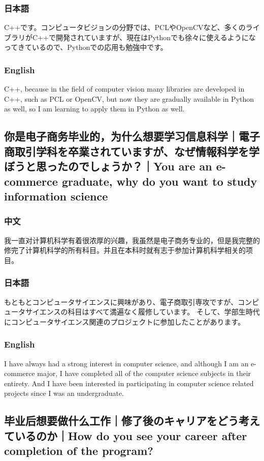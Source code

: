 \documentclass[lang=cn,11pt,a4paper]{elegantpaper}
\begin{document}
\subsubsection{日本語}
C++です。コンピュータビジョンの分野では、PCLやOpenCVなど、多くのライブラリがC++で開発されていますが、現在はPythonでも徐々に使えるようになってきているので、Pythonでの応用も勉強中です。
\subsubsection{English}
C++, because in the field of computer vision many libraries are developed in C++, such as PCL or OpenCV, but now they are gradually available in Python as well, so I am learning to apply them in Python as well.

\subsection{你是电子商务毕业的，为什么想要学习信息科学｜電子商取引学科を卒業されていますが、なぜ情報科学を学ぼうと思ったのでしょうか？｜You are an e-commerce graduate, why do you want to study information science}
\subsubsection{中文}
我一直对计算机科学有着很浓厚的兴趣，我虽然是电子商务专业的，但是我完整的修完了计算机科学的所有科目。并且在本科时就有志于参加计算机科学相关的项目。
\subsubsection{日本語}
もともとコンピュータサイエンスに興味があり、電子商取引専攻ですが、コンピュータサイエンスの科目はすべて満遍なく履修しています。 そして、学部生時代にコンピュータサイエンス関連のプロジェクトに参加したことがあります。
\subsubsection{English}
I have always had a strong interest in computer science, and although I am an e-commerce major, I have completed all of the computer science subjects in their entirety. And I have been interested in participating in computer science related projects since I was an undergraduate.

\subsection{毕业后想要做什么工作｜修了後のキャリアをどう考えているのか｜How do you see your career after completion of the program?}
\end{document}
